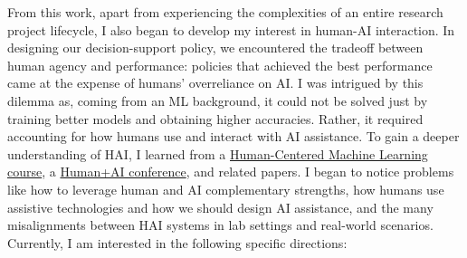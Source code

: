 

From this work, apart from experiencing the complexities of an entire research project lifecycle, I also began to develop my interest in human-AI interaction. In designing our decision-support policy, we encountered the tradeoff between human agency and performance: policies that achieved the best performance came at the expense of humans’ overreliance on AI. I was intrigued by this dilemma as, coming from an ML background, it could not be solved just by training better models and obtaining higher accuracies. Rather, it required accounting for how humans use and interact with AI assistance. To gain a deeper understanding of HAI, I learned from a
\href{https://github.com/ChicagoHAI/human-centered-machine-learning}{Human-Centered Machine Learning course},
a \href{https://datascience.uchicago.edu/events/human-ai-conference/}{Human+AI conference}, and related papers.
I began to notice problems like how to leverage human and AI complementary strengths, how humans use assistive technologies and how we should design AI assistance, and the many misalignments between HAI systems in lab settings and real-world scenarios. Currently, I am interested in the following specific directions:






